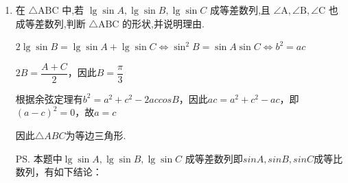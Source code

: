 \begin{enumerate}
\begin{jieda}
\begin{enumerate}
            因此数列 ${a}_{1},{a}_{2},{a}_{{k}_{1}},{a}_{{k}_{2}},\cdots ,{a}_{{k}_{n}},\cdots$ 是以 1 为首项，3 为公比的等比数列，故${a}_{{k}_{n}} = {3}^{n + 1} = 2{k}_{n} - 1$ ,所以 ${k}_{n} = \dfrac{{3}^{n + 1} + 1}{2}$ ,即数列 $\left\{  {k}_{n}\right\}$ 的通项公式为 ${k}_{n} = \dfrac{{3}^{n + 1} + 1}{2}$ .

            \item 由 (1) 可知 $\dfrac{{a}_{n}}{2{k}_{n} - 1} = \dfrac{{2n} - 1}{{3}^{n + 1}}$ .
            令 ${b}_{n} = \dfrac{{2n} - 1}{{3}^{n + 1}}$，则$b_{n+1} - b_n = \dfrac{{2n} + 1}{{3}^{n + 2}} - \dfrac{{2n} - 1}{{3}^{n + 1}} = \dfrac{({2n} + 1) - 3(2n-1)}{{3}^{n + 2}} = \dfrac{4-4n}{{3}^{n + 2}}$
            由此，数列 $\left\{  {b}_{n}\right\}$ 的最大项是 ${b}_{1}$ 与 ${b}_{2}$ .
            
            所以，对任意正整数 $n$ ,恒有 $\dfrac{{a}_{n}}{2{k}_{n} - 1} \leq  \dfrac{{a}_{m}}{2{k}_{m} - 1}\left( {m \in  \mathbf{N},m \geq  1}\right)$ 时, $m = 1$ 或 2 .
        \end{enumerate}
    \end{jieda}
    \item 在 $\bigtriangleup \mathrm{{ABC}}$ 中,若 $\lg \sin A,\lg \sin B,\lg \sin C$ 成等差数列,且 $\angle \mathrm{A},\angle \mathrm{B},\angle \mathrm{C}$ 也成等差数列,判断 $\bigtriangleup  \mathrm{{ABC}}$ 的形状,并说明理由.
    \begin{jieda}
        $2\lg \sin B = \lg \sin A + \lg \sin C \Longleftrightarrow {\sin }^{2}B = \sin A\sin C \Longleftrightarrow b^2 = ac$

        $2B = \dfrac{A+C}{2}$，因此$B = \dfrac{\pi}{3}$

        根据余弦定理有$b^2 = a^2+c^2-2accosB$，因此$ac = a^2+c^2-ac$，即$(a-c)^2 = 0$，故$a = c$
        
        因此$\triangle ABC$为等边三角形.

        \ps 本题中$\lg \sin A,\lg \sin B,\lg \sin C$ 成等差数列即$sinA, sinB, sin C$成等比数列，有如下结论：
    \end{jieda}
\end{enumerate}
